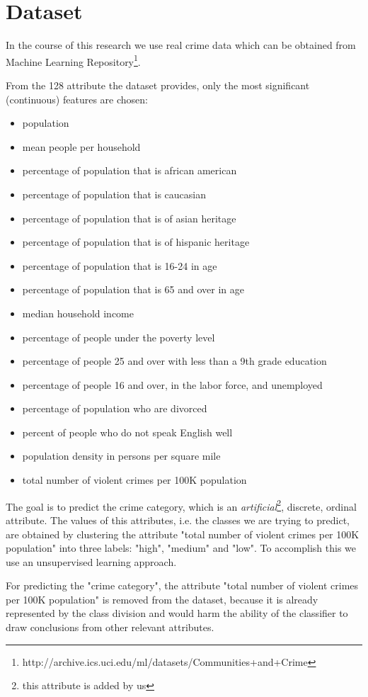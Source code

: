 \section{Dataset}

In the course of this research we use real crime data which can be obtained from Machine Learning Repository\footnote{http://archive.ics.uci.edu/ml/datasets/Communities+and+Crime}.

From the 128 attribute the dataset provides, only the most significant (continuous) features are chosen:

\begin{itemize}
	\setlength{\itemsep}{-2pt}
	\item population 
	\item mean people per household
	\item percentage of population that is african american
	\item percentage of population that is caucasian
	\item percentage of population that is of asian heritage 
	\item percentage of population that is of hispanic heritage
	\item percentage of population that is 16-24 in age
	\item percentage of population that is 65 and over in age 
	\item median household income
	\item percentage of people under the poverty level
	\item percentage of people 25 and over with less than a 9th grade education 
	\item percentage of people 16 and over, in the labor force, and unemployed 
	\item percentage of population who are divorced
	\item percent of people who do not speak English well 
	\item population density in persons per square mile
	\item total number of violent crimes per 100K population 
\end{itemize}

The goal is to predict the crime category, which is an \textit{artificial}\footnote{this attribute is added by us}, discrete, ordinal attribute. The values of this attributes, i.e. the classes we are trying to predict,  are obtained by clustering the attribute "total number of violent crimes per 100K population" into three labels: "high", "medium" and "low". To accomplish this we use an unsupervised learning approach. 

For predicting the "crime category", the attribute "total number of violent crimes per 100K population" is removed from the dataset, because it is already represented by the class division and would harm the ability of the classifier to draw conclusions from other relevant attributes.